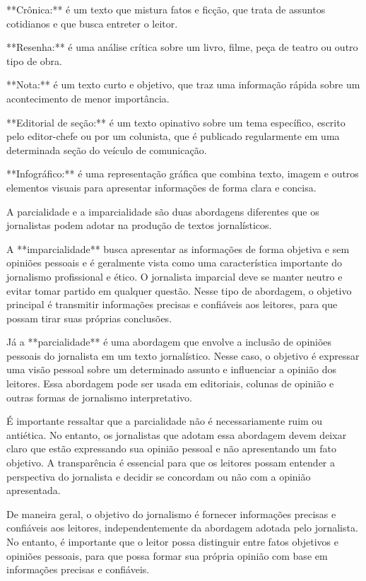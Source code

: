 {**Crônica:** é um texto que mistura fatos e ficção, que trata de
assuntos cotidianos e que busca entreter o leitor.

**Resenha:** é uma análise crítica sobre um livro, filme, peça de teatro
ou outro tipo de obra.

**Nota:** é um texto curto e objetivo, que traz uma informação rápida
sobre um acontecimento de menor importância.

**Editorial de seção:** é um texto opinativo sobre um tema específico,
escrito pelo editor-chefe ou por um colunista, que é publicado
regularmente em uma determinada seção do veículo de comunicação.

**Infográfico:** é uma representação gráfica que combina texto, imagem e
outros elementos visuais para apresentar informações de forma clara e
concisa.

A parcialidade e a imparcialidade são duas abordagens diferentes que os
jornalistas podem adotar na produção de textos jornalísticos.

A **imparcialidade** busca apresentar as informações de forma objetiva e
sem opiniões pessoais e é geralmente vista como uma característica
importante do jornalismo profissional e ético. O jornalista imparcial
deve se manter neutro e evitar tomar partido em qualquer questão. Nesse
tipo de abordagem, o objetivo principal é transmitir informações
precisas e confiáveis aos leitores, para que possam tirar suas próprias
conclusões.

Já a **parcialidade** é uma abordagem que envolve a inclusão de opiniões
pessoais do jornalista em um texto jornalístico. Nesse caso, o objetivo
é expressar uma visão pessoal sobre um determinado assunto e influenciar
a opinião dos leitores. Essa abordagem pode ser usada em editoriais,
colunas de opinião e outras formas de jornalismo interpretativo.

É importante ressaltar que a parcialidade não é necessariamente ruim ou
antiética. No entanto, os jornalistas que adotam essa abordagem devem
deixar claro que estão expressando sua opinião pessoal e não
apresentando um fato objetivo. A transparência é essencial para que os
leitores possam entender a perspectiva do jornalista e decidir se
concordam ou não com a opinião apresentada.

De maneira geral, o objetivo do jornalismo é fornecer informações
precisas e confiáveis aos leitores, independentemente da abordagem
adotada pelo jornalista. No entanto, é importante que o leitor possa
distinguir entre fatos objetivos e opiniões pessoais, para que possa
formar sua própria opinião com base em informações precisas e
confiáveis.

}
